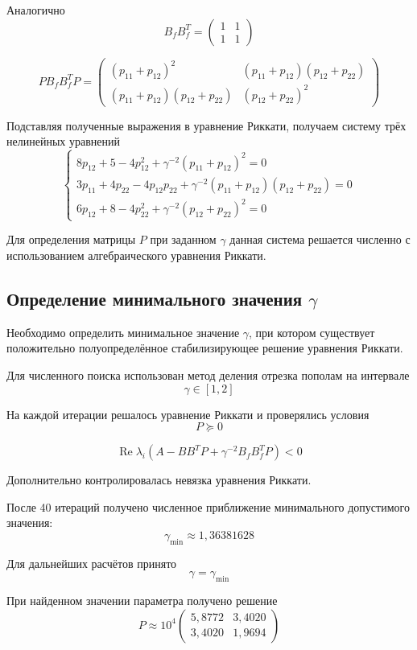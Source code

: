 Аналогично
\[
B_fB_f^T=
\begin{pmatrix}
1&1\\
1&1
\end{pmatrix}
\]

\[
PB_fB_f^TP=
\begin{pmatrix}
(p_{11}+p_{12})^2&
(p_{11}+p_{12})(p_{12}+p_{22})\\
(p_{11}+p_{12})(p_{12}+p_{22})&
(p_{12}+p_{22})^2
\end{pmatrix}
\]

Подставляя полученные выражения в уравнение Риккати,
получаем систему трёх нелинейных уравнений
\[
\begin{cases}
8p_{12}+5-4p_{12}^2+
\gamma^{-2}(p_{11}+p_{12})^2=0\\[2mm]
3p_{11}+4p_{22}-4p_{12}p_{22}+
\gamma^{-2}(p_{11}+p_{12})(p_{12}+p_{22})=0\\[2mm]
6p_{12}+8-4p_{22}^2+
\gamma^{-2}(p_{12}+p_{22})^2=0
\end{cases}
\]

Для определения матрицы $P$ при заданном $\gamma$
данная система решается численно с использованием
алгебраического уравнения Риккати.

\subsection{Определение минимального значения $\gamma$}

Необходимо определить минимальное
значение $\gamma$, при котором существует положительно
полуопределённое стабилизирующее решение уравнения Риккати.

Для численного поиска использован метод деления отрезка
пополам на интервале
\[
\gamma\in[1,2]
\]

На каждой итерации решалось уравнение Риккати и проверялись
условия
\[
P\succeq0
\]

\[
\operatorname{Re}\lambda_i
\left(
A-BB^TP+\gamma^{-2}B_fB_f^TP
\right)<0
\]

Дополнительно контролировалась невязка уравнения Риккати.

После 40 итераций получено численное приближение
минимального допустимого значения:
\[
\gamma_{\min}\approx1{,}36381628
\]

Для дальнейших расчётов принято
\[
\gamma=\gamma_{\min}
\]

При найденном значении параметра получено решение
\[
P\approx10^4
\begin{pmatrix}
5{,}8772&3{,}4020\\
3{,}4020&1{,}9694
\end{pmatrix}
\]


